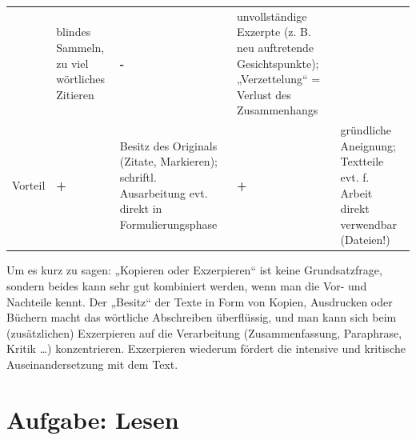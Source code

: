 \documentclass[]{book}
\theoremstyle{definition}
\theoremstyle{definition}
\theoremstyle{definition}
\theoremstyle{remark}
\begin{document}
\begin{longtable}[]{@{}lllll@{}}
\begin{minipage}[t]{0.04\columnwidth}
\end{minipage} & \begin{minipage}[t]{0.21\columnwidth}\raggedright\strut
blindes Sammeln, zu viel wörtliches Zitieren\strut
\end{minipage} & \begin{minipage}[t]{0.04\columnwidth}\raggedright\strut
\textbf{-}\strut
\end{minipage} & \begin{minipage}[t]{0.28\columnwidth}\raggedright\strut
unvollständige Exzerpte (z. B. neu auftretende Gesichtspunkte);
„Verzettelung`` = Verlust des Zusammenhangs \vspace{5mm}\strut
\end{minipage}\tabularnewline
\begin{minipage}[t]{0.28\columnwidth}\raggedright\strut
Vorteil\strut
\end{minipage} & \begin{minipage}[t]{0.04\columnwidth}\raggedright\strut
\textbf{+}\strut
\end{minipage} & \begin{minipage}[t]{0.21\columnwidth}\raggedright\strut
Besitz des Originals (Zitate, Markieren); schriftl. Ausarbeitung evt.
direkt in Formulierungsphase \vspace{5mm}\strut
\end{minipage} & \begin{minipage}[t]{0.04\columnwidth}\raggedright\strut
\textbf{+}\strut
\end{minipage} & \begin{minipage}[t]{0.28\columnwidth}\raggedright\strut
gründliche Aneignung; Textteile evt. f. Arbeit direkt verwendbar
(Dateien!) \vspace{5mm}\strut
\end{minipage}\tabularnewline
\bottomrule
\end{longtable}

Um es kurz zu sagen: „Kopieren oder Exzerpieren`` ist keine
Grundsatzfrage, sondern beides kann sehr gut kombiniert werden, wenn man
die Vor- und Nachteile kennt. Der „Besitz`` der Texte in Form von
Kopien, Ausdrucken oder Büchern macht das wörtliche Abschreiben
überflüssig, und man kann sich beim (zusätzlichen) Exzerpieren auf die
Verarbeitung (Zusammenfassung, Paraphrase, Kritik \ldots{})
konzentrieren. Exzerpieren wiederum fördert die intensive und kritische
Auseinandersetzung mit dem Text.

\section{Aufgabe: Lesen}\label{aufgabe-lesen}
\end{document}
